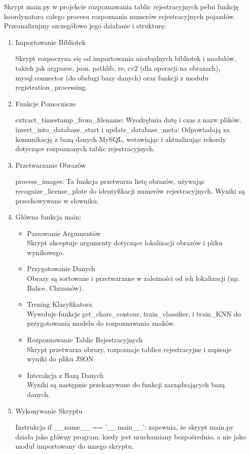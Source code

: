 \documentclass[12pt,a4paper,oneside]{article}
\theoremstyle{definition}
\numberwithin{equation}{section}
\begin{document}
Skrypt main.py w projekcie rozpoznawania tablic rejestracyjnych pełni funkcję koordynatora całego procesu rozpoznania numerów rejestracyjnych pojazdów. Przeanalizujmy szczegółowo jego działanie i strukturę:
\begin{enumerate}

\item Importowanie Bibliotek

    Skrypt rozpoczyna się od importowania niezbędnych bibliotek i modułów, takich jak argparse, json, pathlib, re, cv2 (dla operacji na obrazach), mysql.connector (do obsługi bazy danych) oraz funkcji z modułu registration{\_}processing.

\item Funkcje Pomocnicze

    extract{\_}timestamp{\_}from{\_}filename: Wyodrębnia datę i czas z nazw plików.
    insert{\_}into{\_}database{\_}start i update{\_}database{\_}meta: Odpowiadają za komunikację z bazą danych MySQL, wstawiając i aktualizując rekordy dotyczące rozpoznanych tablic rejestracyjnych.

\item Przetwarzanie Obrazów

    process{\_}images: Ta funkcja przetwarza listę obrazów, używając recognize{\_}license{\_}plate do identyfikacji numerów rejestracyjnych. Wyniki są przechowywane w słowniku.


\item Główna funkcja main:

\begin{itemize}
  \item Parsowanie Argumentów \\
  Skrypt akceptuje argumenty dotyczące lokalizacji obrazów i pliku wynikowego.
  \item Przygotowanie Danych \\
  Obrazy są sortowane i przetwarzane w zależności od ich lokalizacji (np. Balice, Chrzanów).
  \item Trening Klasyfikatora \\
  Wywołuje funkcje get{\_}chars{\_}contour, train{\_}classifier, i train{\_}KNN do przygotowania modelu do rozpoznawania znaków.
  \item Rozpoznawanie Tablic Rejestracyjnych \\
  Skrypt przetwarza obrazy, rozpoznaje tablice rejestracyjne i zapisuje wyniki do pliku JSON
  \item Interakcja z Bazą Danych \\
  Wyniki są następnie przekazywane do funkcji zarządzających bazą danych.
\end{itemize}

    

\item Wykonywanie Skryptu

    Instrukcja if {\_}{\_}name{\_}{\_} == '{\_}{\_}main{\_}{\_}': zapewnia, że skrypt main.py działa jako główny program, kiedy jest uruchamiany bezpośrednio, a nie jako moduł importowany do innego skryptu.
\end{enumerate}
\end{document}
